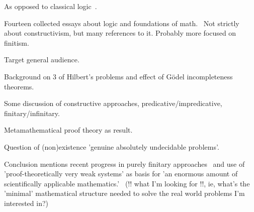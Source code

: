 \cite{Feferman:2000,Diez:2002,sep:mathematics_constructive,
wiki:Constructivism_philosophy_of_mathematics}

As opposed to classical logic~\cite{wiki:Classical_logic}.

\label{sec:Feferman}
\cite{Feferman1998LightOfLogic,Feferman:2000}

\label{sec:In_the_light_of_logic}

Fourteen collected essays about logic and foundations of 
math.~\cite{Feferman1998LightOfLogic}
Not strictly about constructivism, but many references to it.
Probably more focused on finitism.

\label{sec:Deciding_the_undecidable}

\cite[ch.~1 ``Deciding the undecidable'']{Feferman1998LightOfLogic}

Target general audience.

Background on $3$ of Hilbert's problems
and effect of G\"{o}del incompleteness theorems.

Some discussion of constructive approaches, 
predicative/impredicative, finitary/infinitary.

Metamathematical proof theory as result.

Question of (non)existence 
'genuine absolutely undecidable problems'.

Conclusion mentions recent progress
in purely finitary approaches~\cite[ch.~10]{Feferman1998LightOfLogic}
and 
use of 'proof-theoretically very weak systems'
as basis for 'an enormous amount of scientifically applicable
mathematics.'~\cite[ch.~14]{Feferman1998LightOfLogic}
(!! what I'm looking for !!, ie, 
what's the 'minimal' mathematical structure needed to
solve the real world problems I'm interested in?)

\label{sec:Is_Cantor_Necessary}

\cite{Feferman1989CantorNecessary}
\cite[ch.~2 ``Is Cantor necessary?'']{Feferman1998LightOfLogic}

